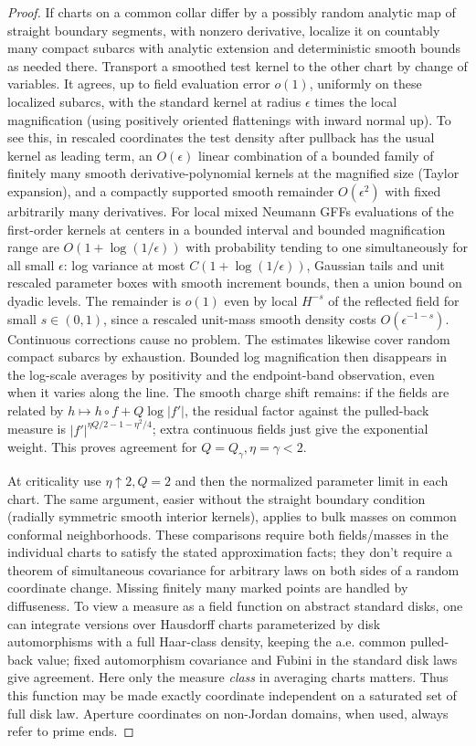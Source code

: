 \begin{proof}
If charts on a common collar differ by a possibly random analytic map of straight boundary segments, with nonzero derivative, localize it on countably many compact subarcs with analytic extension and deterministic smooth bounds as needed there.
Transport a smoothed test kernel to the other chart by change of variables.
It agrees, up to field evaluation error \(o(1)\), uniformly on these localized subarcs, with the standard kernel at radius \(\epsilon\) times the local magnification (using positively oriented flattenings with inward normal up).
To see this, in rescaled coordinates the test density after pullback has the usual kernel as leading term, an \(O(\epsilon)\) linear combination of a bounded family of finitely many smooth derivative-polynomial kernels at the magnified size (Taylor expansion), and a compactly supported smooth remainder \(O(\epsilon^2)\) with fixed arbitrarily many derivatives.
For local mixed Neumann GFFs evaluations of the first-order kernels at centers in a bounded interval and bounded magnification range are \(O(1+\log(1/\epsilon))\) with probability tending to one simultaneously for all small \(\epsilon\): log variance at most \(C(1+\log(1/\epsilon))\), Gaussian tails and unit rescaled parameter boxes with smooth increment bounds, then a union bound on dyadic levels.
The remainder is \(o(1)\) even by local \(H^{-s}\) of the reflected field for small \(s\in(0,1)\), since a rescaled unit-mass smooth density costs \(O(\epsilon^{-1-s})\).
Continuous corrections cause no problem.
The estimates likewise cover random compact subarcs by exhaustion.
Bounded log magnification then disappears in the log-scale averages by positivity and the endpoint-band observation, even when it varies along the line.
The smooth charge shift remains: if the fields are related by \(h\mapsto h\circ f+Q\log|f'|\), the residual factor against the pulled-back measure is \(|f'|^{\eta Q/2-1-\eta^2/4}\); extra continuous fields just give the exponential weight.
This proves agreement for \(Q=Q_\gamma,\eta=\gamma<2\).

At criticality use \(\eta\uparrow2,Q=2\) and then the normalized parameter limit in each chart.
The same argument, easier without the straight boundary condition (radially symmetric smooth interior kernels), applies to bulk masses on common conformal neighborhoods.
These comparisons require both fields/masses in the individual charts to satisfy the stated approximation facts; they don't require a theorem of simultaneous covariance for arbitrary laws on both sides of a random coordinate change.
Missing finitely many marked points are handled by diffuseness.
To view a measure as a field function on abstract standard disks, one can integrate versions over Hausdorff charts parameterized by disk automorphisms with a full Haar-class density, keeping the a.e. common pulled-back value; fixed automorphism covariance and Fubini in the standard disk laws give agreement.
Here only the measure \emph{class} in averaging charts matters.
Thus this function may be made exactly coordinate independent on a saturated set of full disk law.
Aperture coordinates on non-Jordan domains, when used, always refer to prime ends.


\end{proof}
